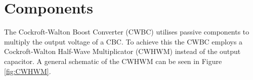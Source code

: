 \section{Components}\label{ch:CD}
The Cockroft-Walton Boost Converter (CWBC) utilises passive components to multiply the output voltage of a CBC.
To achieve this the CWBC employs a Cockroft-Walton Half-Wave Multiplicator (CWHWM) instead of the output capacitor.
A general schematic of the CWHWM can be seen in Figure \ref{fig:CWHWM}.
